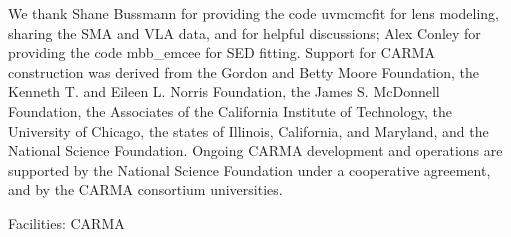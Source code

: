 \documentclass[iop, revtex4]{emulateapj}
\begin{document}
\begin{acknowledgments}
We thank Shane Bussmann for providing the code {\sc uvmcmcfit} for lens modeling, sharing the SMA and VLA data, and for helpful discussions; Alex Conley for providing the code {\sc mbb\_emcee} for SED fitting. 
Support for CARMA construction was derived from the
Gordon and Betty Moore Foundation, the Kenneth T. and Eileen
L. Norris Foundation, the James S. McDonnell Foundation, the
Associates of the California Institute of Technology, the University
of Chicago, the states of Illinois, California, and Maryland,
and the National Science Foundation. 
Ongoing CARMA development
and operations are supported by the National Science
Foundation under a cooperative agreement, and by the CARMA
consortium universities.

Facilities: CARMA
\end{acknowledgments}




\clearpage
\begin{turnpage}

\clearpage
\end{turnpage}


\end{document}
